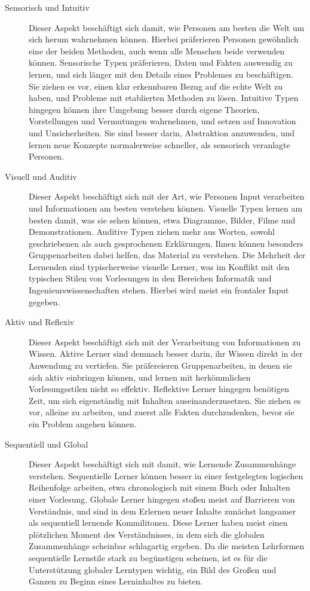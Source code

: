 \begin{description}
    \item[Sensorisch und Intuitiv] Dieser Aspekt beschäftigt sich damit, wie Personen am besten die Welt um sich herum wahrnehmen können. Hierbei präferieren Personen gewöhnlich eine der beiden Methoden, auch wenn alle Menschen beide verwenden können. Sensorische Typen präferieren, Daten und Fakten auswendig zu lernen, und sich länger mit den Details eines Problemes zu beschäftigen. Sie ziehen es vor, einen klar erkennbaren Bezug auf die echte Welt zu haben, und Probleme mit etablierten Methoden zu lösen. Intuitive Typen hingegen können ihre Umgebung besser durch eigene Theorien, Vorstellungen und Vermutungen wahrnehmen, und setzen auf Innovation und Unsicherheiten. Sie sind besser darin, Abstraktion anzuwenden, und lernen neue Konzepte normalerweise schneller, als sensorisch veranlagte Personen.
    \item[Visuell und Auditiv] Dieser Aspekt beschäftigt sich mit der Art, wie Personen Input verarbeiten und Informationen am besten verstehen können. Visuelle Typen lernen am besten damit, was sie sehen können, etwa Diagramme, Bilder, Filme und Demonstrationen. Auditive Typen ziehen mehr aus Worten, sowohl geschriebenen als auch gesprochenen Erklärungen. Ihnen können besonders Gruppenarbeiten dabei helfen, das Material zu verstehen. Die Mehrheit der Lernenden sind typischerweise visuelle Lerner, was im Konflikt mit den typischen Stilen von Vorlesungen in den Bereichen Informatik und Ingenieurswissenschaften stehen. Hierbei wird meist ein frontaler Input gegeben.
    \item[Aktiv und Reflexiv]  Dieser Aspekt beschäftigt sich mit der Verarbeitung von Informationen zu Wissen. Aktive Lerner sind demnach besser darin, ihr Wissen direkt in der Anwendung zu vertiefen. Sie präfereieren Gruppenarbeiten, in denen sie sich aktiv einbringen können, und lernen mit herkömmlichen Vorlesungsstilen nicht so effektiv. Reflektive Lerner hingegen benötigen Zeit, um sich eigenständig mit Inhalten auseinanderzusetzen. Sie ziehen es vor, alleine zu arbeiten, und zuerst alle Fakten durchzudenken, bevor sie ein Problem angehen können.
    \item[Sequentiell und Global] Dieser Aspekt beschäftigt sich mit damit, wie Lernende Zusammenhänge verstehen. Sequentielle Lerner können besser in einer festgelegten logischen Reihenfolge arbeiten, etwa chronologisch mit einem Buch oder Inhalten einer Vorlesung. Globale Lerner hingegen stoßen meist auf Barrieren von Verständnis, und sind in dem Erlernen neuer Inhalte zunächst langsamer als sequentiell lernende Kommilitonen. Diese Lerner haben meist einen plötzlichen Moment des Verständnisses, in dem sich die globalen Zusammenhänge scheinbar schlagartig ergeben. Da die meisten Lehrformen sequentielle Lernstile stark zu begünstigen scheinen, ist es für die Unterstützung globaler Lerntypen wichtig, ein Bild des Großen und Ganzen zu Beginn eines Lerninhaltes zu bieten.
\end{description}

